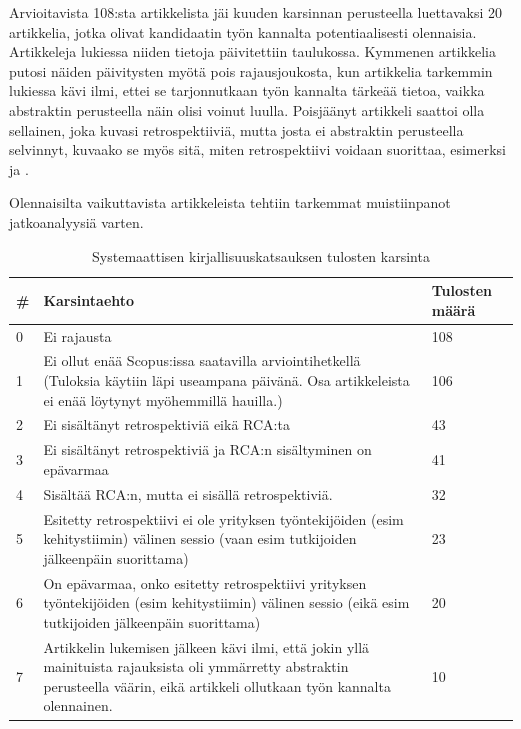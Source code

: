 Arvioitavista 108:sta artikkelista jäi kuuden karsinnan perusteella luettavaksi 20 artikkelia, jotka olivat kandidaatin työn kannalta potentiaalisesti olennaisia. Artikkeleja lukiessa niiden tietoja päivitettiin taulukossa. Kymmenen artikkelia putosi näiden päivitysten myötä pois rajausjoukosta, kun artikkelia tarkemmin lukiessa kävi ilmi, ettei se tarjonnutkaan työn kannalta tärkeää tietoa, vaikka abstraktin perusteella näin olisi voinut luulla. Poisjäänyt artikkeli saattoi olla sellainen, joka kuvasi retrospektiiviä, mutta josta ei abstraktin perusteella selvinnyt, kuvaako se myös sitä, miten retrospektiivi voidaan suorittaa, esimerksi \citep{glass2002loyal} ja \citep{drury2012obstacles}.

Olennaisilta vaikuttavista artikkeleista tehtiin tarkemmat muistiinpanot jatkoanalyysiä varten.

\begin{table}
    \begin{tabular}{|p{0.5cm}|p{11.5cm}|p{2cm}|}
        \hline
        \textbf{\#} & \textbf{Karsintaehto} & \textbf{Tulosten määrä} \\ \hline
        0 & Ei rajausta                                                                                                                                               & 108            \\ \hline
        1 & Ei ollut enää Scopus:issa saatavilla arviointihetkellä (Tuloksia käytiin läpi useampana päivänä. Osa artikkeleista ei enää löytynyt myöhemmillä hauilla.) & 106            \\ \hline
        2 & Ei sisältänyt retrospektiviä eikä RCA:ta                                                                                                                          & 43             \\ \hline
        3 & Ei sisältänyt retrospektiviä ja RCA:n sisältyminen on epävarmaa                                                                                                   & 41             \\ \hline
        4 & Sisältää RCA:n, mutta ei sisällä retrospektiviä.                                                                                                                  & 32             \\ \hline
        5 & Esitetty retrospektiivi ei ole yrityksen työntekijöiden (esim kehitystiimin) välinen sessio (vaan esim tutkijoiden jälkeenpäin suorittama)                & 23             \\ \hline
        6 & On epävarmaa, onko esitetty retrospektiivi yrityksen työntekijöiden (esim kehitystiimin) välinen sessio (eikä esim tutkijoiden jälkeenpäin suorittama)    & 20             \\
        \hline
        7 & Artikkelin lukemisen jälkeen kävi ilmi, että jokin yllä mainituista rajauksista oli ymmärretty abstraktin perusteella väärin, eikä artikkeli ollutkaan työn kannalta olennainen. & 10 \\ \hline
    \end{tabular}
    \caption{Systemaattisen kirjallisuuskatsauksen tulosten karsinta}
    \label{tab:karsintaehdot_taulukko}
\end{table}

